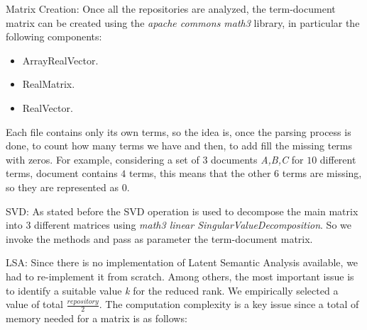 Matrix Creation: Once all the repositories are analyzed, the term-document matrix can be created using the \emph{apache commons math3} library, in particular the following components:

\begin{itemize}
\item ArrayRealVector.
\item RealMatrix.
\item RealVector.
\end{itemize}

Each file contains only its own terms, so the idea is, once the parsing process is done, to count how many terms we have and then, to add fill the missing terms with zeros. For example, considering a set of $3$ documents \emph{A,B,C} for $10$ different terms, document contains $4$ terms, this means that the other 6 terms are missing, so they are represented as $0$.


SVD: As stated before the SVD operation is used to decompose the main matrix into $3$ different matrices using \emph{math3 linear SingularValueDecomposition}. So we invoke the methods and pass as parameter the term-document matrix. %


%
%



LSA: Since there is no implementation of Latent Semantic Analysis available, we had to re-implement it from scratch. Among others, the most important issue is to identify a suitable value \emph{k} for the reduced rank. We empirically selected a value of total $\frac{repository}{2}$. The computation complexity is a key issue since a total of memory needed for a matrix is as follows:


